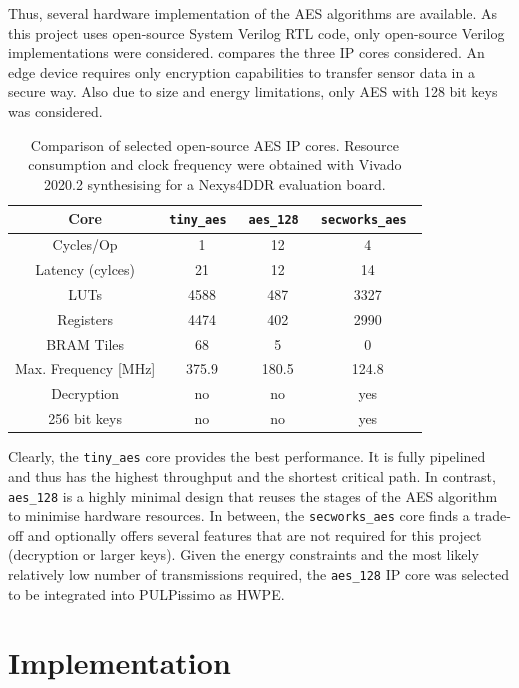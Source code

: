 \documentclass[a4paper, 12pt]{article}
\begin{document}
Thus, several hardware implementation of the AES algorithms are available. As this project uses open-source System Verilog RTL code, only open-source Verilog implementations were considered.  compares the three IP cores considered. An edge device requires only encryption capabilities to transfer sensor data in a secure way. Also due to size and energy limitations, only AES with 128 bit keys was considered.

\begin{table}[h]
    \centering
    \begin{tabular}{c|c c c}
        \toprule
        Core &  \verb|tiny_aes|~\cite{tiny-aes} & \verb|aes_128|~\cite{aes-128} & \verb|secworks_aes|~\cite{secworks-aes}  \\
        \midrule
        Cycles/Op &  1 & 12 & 4\\
        Latency (cylces) & 21 & 12 & 14\\
        LUTs & 4588 & 487 & 3327 \\
        Registers & 4474 & 402 & 2990 \\
        BRAM Tiles & 68 & 5 & 0 \\
        Max. Frequency [MHz] & 375.9 & 180.5 & 124.8 \\
        Decryption & no & no  & yes \\
        256 bit keys & no & no & yes\\
        \bottomrule
    \end{tabular}
	\label{tab:aes_cores}
	\caption{Comparison of selected open-source AES IP cores. Resource consumption and clock frequency were obtained with Vivado 2020.2 synthesising for a Nexys4DDR evaluation board.}
\end{table}

Clearly, the \verb|tiny_aes| core provides the best performance. It is fully pipelined and thus has the highest throughput and the shortest critical path. In contrast, \verb|aes_128| is a highly minimal design that reuses the stages of the AES algorithm to minimise hardware resources. In between, the \verb|secworks_aes| core finds a trade-off and optionally offers several features that are not required for this project (decryption or larger keys). Given the energy constraints and the most likely relatively low number of transmissions required, the \verb|aes_128| IP core was selected to be integrated into PULPissimo as HWPE.

\section{Implementation} \label{sec:implementation}
\end{document}
